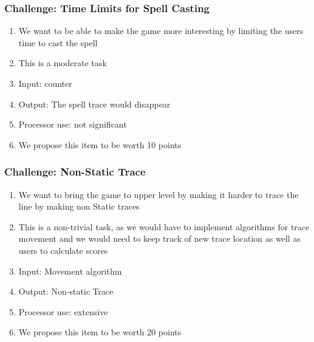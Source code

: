 \documentclass[letterpaper]{article} %
\begin{document}
\subsubsection{Challenge: Time Limits for Spell Casting}
    \begin{enumerate}
        \item We want to be able to make the game more interesting by limiting the users time to cast the spell
        \item This is a moderate task
        \item Input: counter
        \item Output: The spell trace would disappear
        \item Processor use: not significant
        \item We propose this item to be worth 10 points
    \end{enumerate}

\subsubsection{Challenge: Non-Static Trace}
    \begin{enumerate}
        \item We want to bring the game to upper level by making it harder to trace the line by making non Static traces
        \item This is a non-trivial task, as we would have to implement algorithms for trace movement and we would need to keep track of new trace location as well as users to calculate scores
        \item Input: Movement algorithm
        \item Output: Non-static Trace
        \item Processor use: extensive
        \item We propose this item to be worth 20 points
    \end{enumerate}
    
\end{document}
